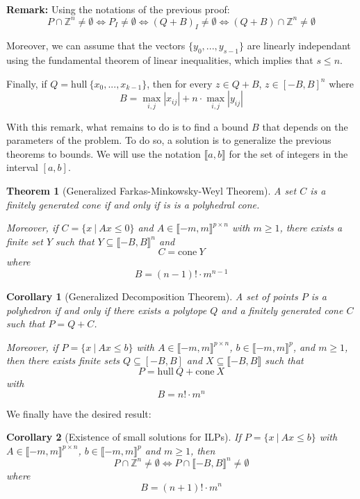 \documentclass{article}
\newcommand{\cone}{\mathrm{cone}}
\newcommand{\hull}{\mathrm{hull}}
\newcommand{\ints}{\mathbb{Z}}
\newcommand{\ifff}{if and only if}
\newtheorem{theorem}{Theorem}
\newtheorem{corollary}{Corollary}
\begin{document}
\textbf{Remark:}
Using the notations of the previous proof:
$$P \cap \ints^n \neq \emptyset \Longleftrightarrow
  P_I \neq \emptyset            \Longleftrightarrow
  (Q + B)_I \neq \emptyset      \Longleftrightarrow
  (Q + B) \cap \ints^n \neq \emptyset$$

Moreover, we can assume that the vectors $\{y_0, ..., y_{s-1}\}$ are linearly
independant using the fundamental theorem of linear inequalities, which implies
that $s \leqslant n$.

Finally, if $Q = \hull~\{x_0, ..., x_{k-1}\}$, then for every
$z \in Q + B$, $z \in [-B, B]^n$ where
$$B = \max_{i, j} |x_{ij}| + n \cdot \max_{i, j} |y_{ij}|$$


With this remark, what remains to do is to find a bound $B$ that depends on the
parameters of the problem. To do so, a solution is to generalize the previous
theorems to bounds. %
We will use the notation
$\llbracket a, b \rrbracket$ for the set of integers in the interval $[a, b]$.

\begin{theorem}[Generalized Farkas-Minkowsky-Weyl Theorem]
  A set $C$ is a finitely generated cone \ifff{} is is a polyhedral cone.

  Moreover, if $C = \{x~|~Ax \leqslant 0\}$ and
  $A \in \llbracket -m, m \rrbracket^{p \times n}$ with $m \geqslant 1$,
  there exists a finite set $Y$ such that
  $Y \subseteq \llbracket -B, B \rrbracket^n$
  and $$C = \cone~Y$$ where
  $$B = (n - 1)! \cdot m^{n-1}$$
\end{theorem}

\begin{corollary}[Generalized Decomposition Theorem]
  A set of points $P$ is a polyhedron \ifff{} there exists a polytope $Q$ and a
  finitely generated cone $C$ such that $P = Q + C$.

  Moreover, if $P = \{x~|~Ax \leqslant b\}$ with
  $A \in \llbracket -m, m \rrbracket^{p \times n}$,
  $b \in \llbracket -m, m \rrbracket^p$, and $m \geqslant 1$,
  then there exists finite sets
  $Q \subseteq [-B, B]$ and $X \subseteq \llbracket -B, B \rrbracket$ such that
  $$P = \hull~Q + \cone~X$$ with $$B = n! \cdot m^n$$
\end{corollary}

We finally have the desired result:

\begin{corollary}[Existence of small solutions for ILPs]
  \label{small-ilp}
  If $P = \{x~|~Ax \leqslant b\}$ with
  $A \in \llbracket -m, m \rrbracket^{p \times n}$,
  $b \in \llbracket -m, m \rrbracket^p$ and $m \geqslant 1$, then
  $$P \cap \ints^n \neq \emptyset \Longleftrightarrow
  P \cap \llbracket -B, B \rrbracket^n \neq \emptyset$$ where
  $$B = (n + 1)! \cdot m^n$$
\end{corollary}
\end{document}
